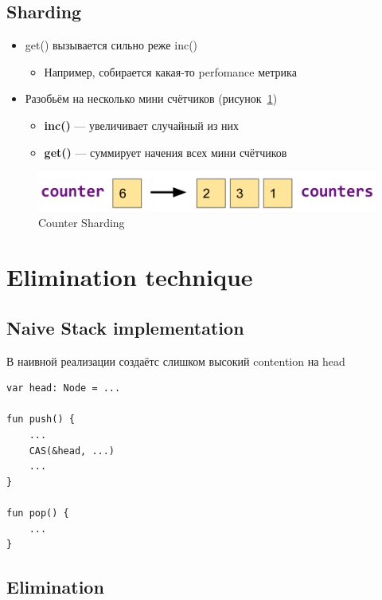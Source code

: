 \documentclass[10pt,a4paper,oneside,titlepage]{article}
\theoremstyle{plain}
\theoremstyle{defenition}
\begin{document}
\subsection{Sharding}

\begin{itemize}
	\item get() вызывается сильно реже inc()
	\begin{itemize}
		\item Например, собирается какая-то perfomance метрика
	\end{itemize}
    \item Разобьём на несколько мини счётчиков (рисунок~\ref{fig:countersharding})
    \begin{itemize}
    	\item {\bfseries inc()} --- увеличивает случайный из них
    	\item {\bfseries get()} --- суммирует начения всех мини счётчиков
    \end{itemize}
\end{itemize}

\begin{figure}[h!]
	\centering
	\includegraphics[width=0.4\linewidth]{pictures/CounterSharding}
	\caption{Counter Sharding}
	\label{fig:countersharding}
\end{figure}

\section{Elimination technique}

\subsection{Naive Stack implementation}

В наивной реализации создаётс слишком высокий contention на head

\begin{lstlisting}
var head: Node = ...

fun push() {
    ...
    CAS(&head, ...)
    ...
}

fun pop() {
    ...
}
\end{lstlisting}

\subsection{Elimination}
\end{document}
